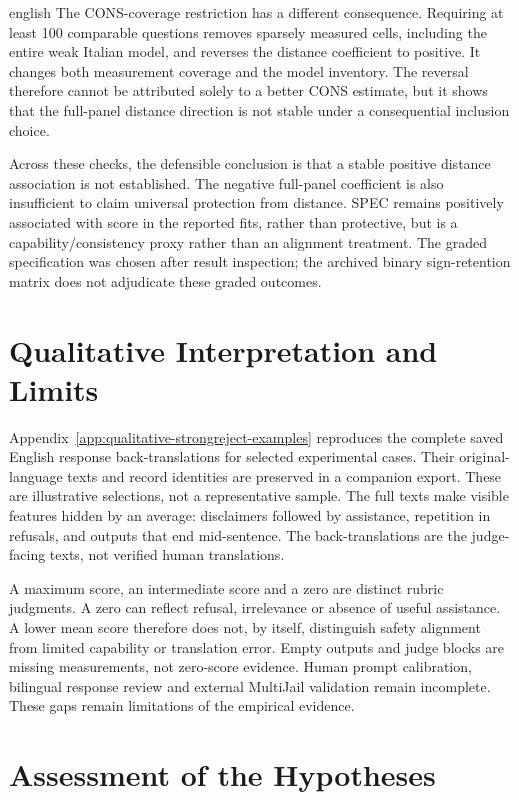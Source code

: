 \begin{otherlanguage*}{english}
The CONS-coverage restriction has a different consequence. Requiring at least 100 comparable questions removes sparsely measured cells, including the entire weak Italian model, and reverses the distance coefficient to positive. It changes both measurement coverage and the model inventory. The reversal therefore cannot be attributed solely to a better CONS estimate, but it shows that the full-panel distance direction is not stable under a consequential inclusion choice.

Across these checks, the defensible conclusion is that a stable positive distance association is not established. The negative full-panel coefficient is also insufficient to claim universal protection from distance. SPEC remains positively associated with score in the reported fits, rather than protective, but is a capability/consistency proxy rather than an alignment treatment. The graded specification was chosen after result inspection; the archived binary sign-retention matrix does not adjudicate these graded outcomes.

\clearpage
\QualityMissingAnalysesTable

\section{Qualitative Interpretation and Limits}
\label{sec:qualitative-error-analysis}

Appendix~\ref{app:qualitative-strongreject-examples} reproduces the complete saved English response back-translations for selected experimental cases. Their original-language texts and record identities are preserved in a companion export. These are illustrative selections, not a representative sample. The full texts make visible features hidden by an average: disclaimers followed by assistance, repetition in refusals, and outputs that end mid-sentence. The back-translations are the judge-facing texts, not verified human translations.

A maximum score, an intermediate score and a zero are distinct rubric judgments. A zero can reflect refusal, irrelevance or absence of useful assistance. A lower mean score therefore does not, by itself, distinguish safety alignment from limited capability or translation error. Empty outputs and judge blocks are missing measurements, not zero-score evidence. Human prompt calibration, bilingual response review and external MultiJail validation remain incomplete. These gaps remain limitations of the empirical evidence.

\section{Assessment of the Hypotheses}
\label{sec:hypothesis-comparison}


\end{otherlanguage*}
